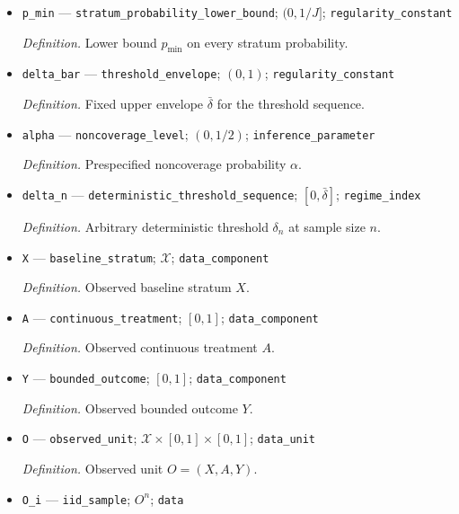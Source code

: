 \documentclass{article}
\begin{document}
\begin{itemize}
  \par\smallskip\noindent\emph{Definition.} Upper polynomial-density comparison constant \(c_+\).
  \item \texttt{p\_\allowbreak{}min} --- \texttt{stratum\_\allowbreak{}probability\_\allowbreak{}lower\_\allowbreak{}bound}; \((0,1/J]\); \texttt{regularity\_\allowbreak{}constant}
  \par\smallskip\noindent\emph{Definition.} Lower bound \(p_{\min}\) on every stratum probability.
  \item \texttt{delta\_\allowbreak{}bar} --- \texttt{threshold\_\allowbreak{}envelope}; \((0,1)\); \texttt{regularity\_\allowbreak{}constant}
  \par\smallskip\noindent\emph{Definition.} Fixed upper envelope \(\bar\delta\) for the threshold sequence.
  \item \texttt{alpha} --- \texttt{noncoverage\_\allowbreak{}level}; \((0,1/2)\); \texttt{inference\_\allowbreak{}parameter}
  \par\smallskip\noindent\emph{Definition.} Prespecified noncoverage probability \(\alpha\).
  \item \texttt{delta\_\allowbreak{}n} --- \texttt{deterministic\_\allowbreak{}threshold\_\allowbreak{}sequence}; \([0,\bar\delta]\); \texttt{regime\_\allowbreak{}index}
  \par\smallskip\noindent\emph{Definition.} Arbitrary deterministic threshold \(\delta_n\) at sample size \(n\).
  \item \texttt{X} --- \texttt{baseline\_\allowbreak{}stratum}; \(\mathcal X\); \texttt{data\_\allowbreak{}component}
  \par\smallskip\noindent\emph{Definition.} Observed baseline stratum \(X\).
  \item \texttt{A} --- \texttt{continuous\_\allowbreak{}treatment}; \([0,1]\); \texttt{data\_\allowbreak{}component}
  \par\smallskip\noindent\emph{Definition.} Observed continuous treatment \(A\).
  \item \texttt{Y} --- \texttt{bounded\_\allowbreak{}outcome}; \([0,1]\); \texttt{data\_\allowbreak{}component}
  \par\smallskip\noindent\emph{Definition.} Observed bounded outcome \(Y\).
  \item \texttt{O} --- \texttt{observed\_\allowbreak{}unit}; \(\mathcal X\times[0,1]\times[0,1]\); \texttt{data\_\allowbreak{}unit}
  \par\smallskip\noindent\emph{Definition.} Observed unit \(O=(X,A,Y)\).
  \item \texttt{O\_\allowbreak{}i} --- \texttt{iid\_\allowbreak{}sample}; \(O^n\); \texttt{data}

\end{itemize}
\end{document}
